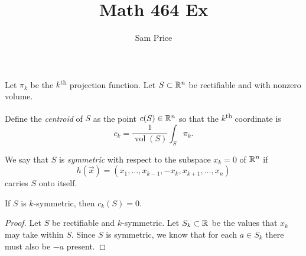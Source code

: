 \documentclass{article}
\author{Sam Price}
\title{Math 464 Ex}
\DeclareMathOperator{\vol}{vol}
\begin{document}
\maketitle

Let $\pi_{k}$ be the $k$\textsuperscript{th} projection function.
Let $S \subset \RR[n]$ be rectifiable and with nonzero volume.

Define the \emph{centroid} of $S$ as the point $c(S) \in \RR[n]$ so that
the $k$\textsuperscript{th} coordinate is
\[ c_{k} = \frac{1}{\vol(S)}\int_{S}\pi_{k}. \]

We say that $S$ is \emph{symmetric} with respect to the subspace $x_{k} = 0$ of $\RR[n]$ if
\[ h(\vec{x}) = (x_{1}, \ldots, x_{k-1}, -x_{k}, x_{k+1}, \ldots, x_{n}) \]
carries $S$ onto itself.

\begin{proposition}{}{}
  If $S$ is $k$-symmetric, then $c_{k}(S) = 0$.
\end{proposition}

\begin{proof}
  Let $S$ be rectifiable and $k$-symmetric.
  Let $S_{k} \subset \RR$ be the values that $x_{k}$ may take within $S$.
  Since $S$ is symmetric, we know that for each $a \in S_{k}$ there must also be $-a$ present.
\end{proof}
\end{document}
